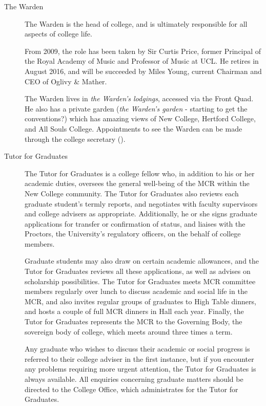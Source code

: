 \begin{description}

\item[The Warden]
The Warden is the head of college, and is ultimately responsible for all aspects of college life. 

From 2009, the role has been taken by Sir Curtis Price, former Principal of the
Royal Academy of Music and Professor of Music at UCL. He retires in August 2016, and will be succeeded by Miles Young, current Chairman and CEO of Oglivy \& Mather.

The Warden lives in \emph{the Warden's lodgings}, accessed via the Front Quad.
He also has a private garden (\emph{the Warden's garden} - starting to get the
conventions?) which has amazing views of New College, Hertford College, and All Souls College.
Appointments to see the Warden can be made through the college secretary (\href{mailto:warden@new.ox.ac.uk}{}).

\item[Tutor for Graduates]
The Tutor for Graduates is a college fellow who, in addition to his or her academic duties, oversees the general well-being of the MCR within the New College community. The Tutor for Graduates also reviews each graduate student's termly reports, and negotiates with faculty supervisors and college advisers as appropriate. Additionally, he or she signs graduate applications for transfer or confirmation of status, and liaises with the Proctors, the University's regulatory officers, on the behalf of college members.

Graduate students may also draw on certain academic allowances, and the Tutor for Graduates reviews all these applications, as well as advises on scholarship possibilities. The Tutor for Graduates meets MCR committee members regularly over lunch to discuss academic and social life in the MCR, and also invites regular groups of graduates to High Table dinners, and hosts a couple of full MCR dinners in Hall each year. Finally, the Tutor for Graduates represents the MCR to the Governing Body, the sovereign body of college, which meets around three times a term. 

Any graduate who wishes to discuss their academic or social progress is referred to their college adviser in the first instance, but if you encounter any problems requiring more urgent attention, the Tutor for Graduates is always available. All enquiries concerning graduate matters should be directed to the College Office, which administrates for the Tutor for Graduates.


\end{description}
